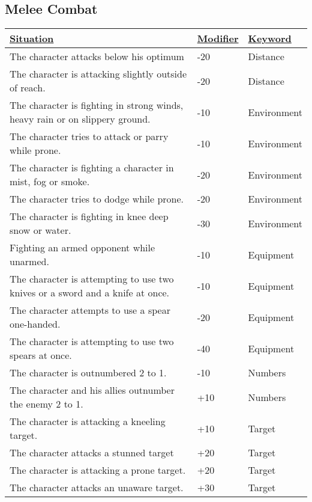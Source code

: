 \subsection{Melee Combat}
\begin{tabularx}{\textwidth}{|X|l|l|}
	\hline
	\ul{Situation} & \ul{Modifier} & \ul{Keyword} \\ \hline
	The character attacks below his optimum & -20 & Distance \\ \hline
	The character is attacking slightly outside of reach. & -20 & Distance \\ \hline
	The character is fighting in strong winds, heavy rain or on slippery ground. & -10 & Environment \\ \hline
	The character tries to attack or parry while prone. & -10 & Environment \\ \hline
	The character is fighting a character in mist, fog or smoke. & -20 & Environment \\ \hline
	The character tries to dodge while prone. & -20 & Environment \\ \hline
	The character is fighting in knee deep snow or water. & -30 & Environment \\ \hline
	Fighting an armed opponent while unarmed. & -10 & Equipment \\ \hline
	The character is attempting to use two knives or a sword and a knife at once. & -10 & Equipment \\ \hline
	The character attempts to use a spear one-handed. & -20 & Equipment \\ \hline
	The character is attempting to use two spears at once. & -40 & Equipment \\ \hline
	The character is outnumbered 2 to 1. & -10 & Numbers \\ \hline
	The character and his allies outnumber the enemy 2 to 1. & +10 & Numbers \\ \hline
	The character is attacking a kneeling target. & +10 & Target \\ \hline
	The character attacks a stunned target & +20 & Target \\ \hline
	The character is attacking a prone target. & +20 & Target \\ \hline
	The character attacks an unaware target. & +30 & Target \\ \hline
\end{tabularx}
